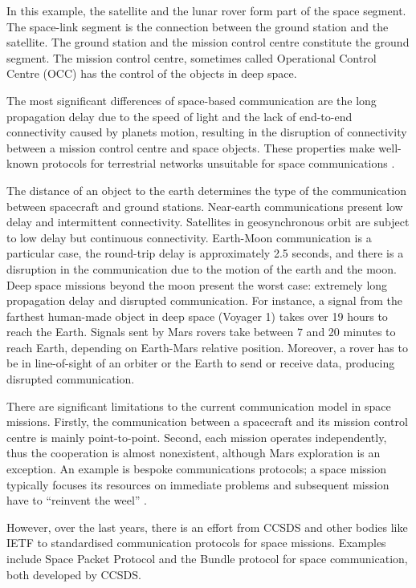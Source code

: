 In this example, the satellite and the lunar rover form part of the space segment. The space-link segment is the connection between the ground station and the satellite.  The ground station and the mission control centre constitute the ground segment. The mission control centre, sometimes called Operational Control Centre (OCC) has the control of the objects in deep space.

 The most significant differences of space-based communication are the long propagation delay due to the speed of light and the lack of end-to-end connectivity caused by planets motion, resulting in the disruption of connectivity between a mission control centre and space objects. These properties make well-known protocols for terrestrial networks unsuitable for space communications \cite{fall2003delay}.


The distance of an object to the earth determines the type of the communication between spacecraft and ground stations. Near-earth communications present low delay and intermittent connectivity. Satellites in geosynchronous orbit are subject to low delay but continuous connectivity. Earth-Moon communication is a particular case, the round-trip delay is approximately 2.5 seconds, and there is a disruption in the communication due to the motion of the earth and the moon. Deep space missions beyond the moon present the worst case: extremely long propagation delay and disrupted communication. For instance,  a signal from the farthest human-made object in deep space (Voyager 1) takes over 19 hours to reach the Earth. Signals sent by Mars rovers take between 7 and 20 minutes to reach Earth, depending on Earth-Mars relative position. Moreover, a rover has to be in line-of-sight of an orbiter or the Earth to send or receive data, producing disrupted communication. 



There are significant limitations to the current communication model in space missions. Firstly,  the communication between a spacecraft and its mission control centre is mainly point-to-point. Second, each mission operates independently, thus the cooperation is almost nonexistent, although Mars exploration is an exception. An example is bespoke communications protocols; a space mission typically focuses its resources on immediate problems and subsequent mission have to ``reinvent the weel'' \cite{burleigh2003interplanetary}. 

However, over the last years, there is an effort from CCSDS and other bodies like IETF to standardised communication protocols for space missions. Examples include Space Packet Protocol and the Bundle protocol for space communication, both developed by CCSDS.%

